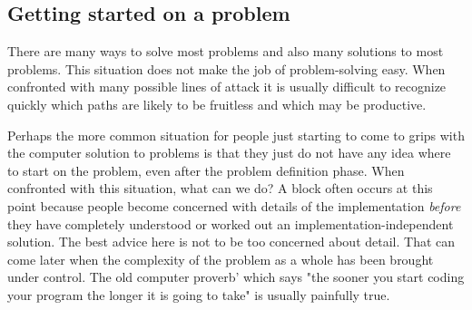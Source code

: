\documentclass{book}
\begin{document}
\subsection{Getting started on a problem}
	There are many ways to solve most problems and also many solutions to most problems. This situation does not make the job of problem-solving easy. When confronted with many possible lines of attack it is usually difficult to recognize quickly which paths are likely to be fruitless and which may be productive.\par
	Perhaps the more common situation for people just starting to come to grips with the computer solution to problems is that they just do not have any idea where to start on the problem, even after the problem definition phase. When confronted with this situation, what can we do? A block often occurs at this point because people become concerned with details of the implementation \textit{before} they have completely understood or worked out an implementation-independent solution. The best advice here is not to be too concerned about detail. That can come later when the complexity of the problem as a whole has been brought under control. The old computer proverb' which says "the sooner you start coding your program the longer it is going to take" is usually painfully true.
\end{document}
